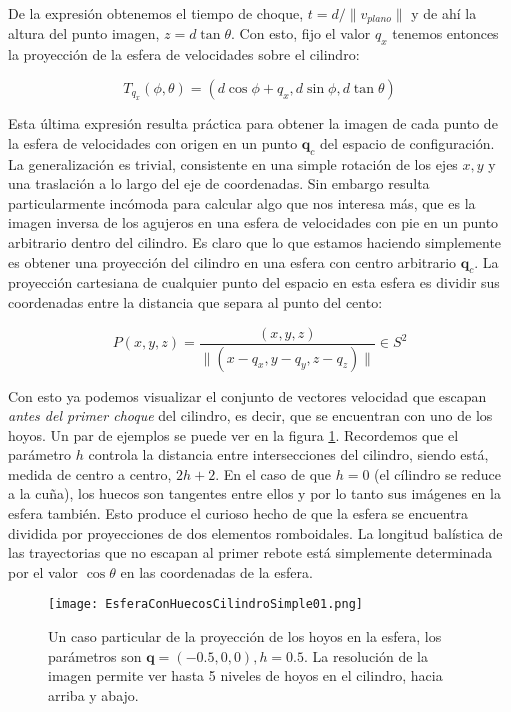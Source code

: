 \documentclass[letterpaper,12pt]{article}
\newcommand{\qfase}{\mathbf{q}}
\begin{document}
De la expresión obtenemos el tiempo de choque, $t=d/\|v_{plano}\|$ y de ahí
la altura del punto imagen, $z=d \tan \theta$. Con esto, fijo el valor
$q_x$ tenemos entonces la proyección de la esfera de velocidades sobre
el cilindro:

\begin{equation}\label{SuperMercator}
T_{q_x}(\phi,\theta)=( d \cos \phi +q_x, d \sin \phi, d \tan\theta)
\end{equation}

Esta última expresión resulta práctica para obtener la imagen de cada
punto de la esfera de velocidades con origen en un punto $\qfase_c$ del
espacio de configuración. La generalización es trivial, consistente
en una simple rotación de los ejes $x,y$ y una traslación a lo
largo del eje de coordenadas. Sin embargo resulta particularmente
incómoda para calcular algo que nos interesa más, que es la imagen
inversa de los agujeros en una esfera de velocidades con pie en un
punto arbitrario dentro del cilindro. 
Es claro que lo que estamos haciendo simplemente es obtener una proyección
del cilindro en una esfera con centro arbitrario $\qfase_c$. La proyección
cartesiana
de cualquier punto del espacio en esta esfera es dividir sus coordenadas entre
la distancia que separa al punto del cento: 

\begin{equation}
P(x,y,z)=\frac{(x,y,z)}{\|(x-q_x,y-q_y,z-q_z)\|} \in S^2 
\end{equation} 

Con esto ya podemos visualizar el conjunto de vectores velocidad
que escapan \emph{antes del primer choque} del cilindro, es decir, que
se encuentran con uno de los hoyos. Un par de ejemplos se puede ver en la figura
\ref{esferaconhuecos}. Recordemos que el parámetro $h$ controla la distancia
entre intersecciones del cilindro, siendo está, medida de centro a centro,
$2h+2$. En el caso de que $h=0$ (el cílindro se reduce a la cuña), los huecos
son tangentes entre ellos y por lo tanto sus imágenes en la esfera también. Esto
produce el curioso hecho de que la esfera se encuentra dividida por proyecciones
de dos elementos romboidales. La longitud balística de las trayectorias que no
escapan al primer rebote está simplemente determinada por el valor $\cos \theta$
en las coordenadas de la esfera. 

\begin{figure}
  \centering
  \texttt{[image: EsferaConHuecosCilindroSimple01.png]}
  \caption{Un caso particular de la proyección de los hoyos en la esfera,
    los parámetros son $\qfase=(-0.5,0,0), h=0.5$. La resolución de la imagen permite
ver hasta 5 niveles de hoyos en el cilindro, hacia arriba y abajo.}
  \label{esferaconhuecos}
\end{figure}
\end{document}
